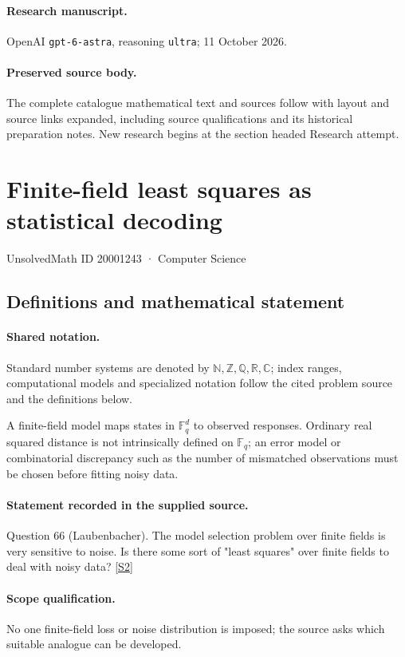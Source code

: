 \documentclass[11pt]{article}
\begin{document}
\paragraph{Research manuscript.} OpenAI \texttt{gpt-6-astra}, reasoning \texttt{ultra}; 11 October 2026.
\paragraph{Preserved source body.} The complete catalogue mathematical text and sources follow with layout and source links expanded, including source qualifications and its historical preparation notes. New research begins at the section headed Research attempt.

\section{Finite-field least squares as statistical decoding}\label{20001243}
{\small UnsolvedMath ID 20001243 · Computer Science}
\subsection{Definitions and mathematical statement}

\paragraph{Shared notation.}Standard number systems are denoted by $\mathbb N,\mathbb Z,\mathbb Q,\mathbb R,\mathbb C$; index ranges, computational models and specialized notation follow the cited problem source and the definitions below.


A finite-field model maps states in $\mathbb F_q^d$ to observed responses. Ordinary real squared distance is not intrinsically defined on $\mathbb F_q$; an error model or combinatorial discrepancy such as the number of mismatched observations must be chosen before fitting noisy data.
\paragraph{Statement recorded in the supplied source.}
Question 66 (Laubenbacher). The model selection problem over finite fields is very sensitive to noise. Is there some sort of "least squares" over finite fields to deal with noisy data? \href{https://aimath.org/WWN/compalgstat/compalgstat.pdf}{[S2]}
\paragraph{Scope qualification.}
No one finite-field loss or noise distribution is imposed; the source asks which suitable analogue can be developed.
\end{document}
